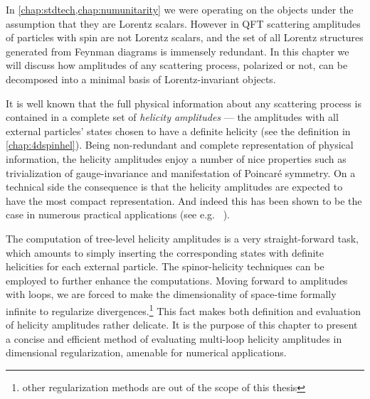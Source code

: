 In \cref{chap:stdtech,chap:numunitarity} we were operating on the objects under the assumption that they are Lorentz scalars.
However in QFT scattering amplitudes of particles with spin are not Lorentz scalars,
and the set of all Lorentz structures generated from Feynman diagrams is immensely redundant.
In this chapter we will discuss how amplitudes of any scattering process, 
polarized or not, can be decomposed into a minimal basis of Lorentz-invariant objects.

It is well known that the full physical information about any scattering process is contained in a complete set of \textit{helicity amplitudes} ---
the amplitudes with all external particles' states chosen to have a definite helicity (see the definition in \cref{chap:4dspinhel}).
Being non-redundant and complete representation of physical information, the helicity amplitudes 
enjoy a number of nice properties such as trivialization of gauge-invariance and manifestation of Poincaré symmetry.
On a technical side the consequence is that the helicity amplitudes are expected to have the most compact representation.
And indeed this has been shown to be the case in numerous practical applications (see e.g.\ %
\cite{DeLaurentis:2019phz,Badger:2019djh,Badger:2011yu,Badger:2013gxa,DeFreitas:2004kmi,Gehrmann:2011aa,Gehrmann:2009vu,Glover:2004si,Glover:2003cm,Garland:2002ak,Dunbar:2016aux,Dunbar:2016gjb,Dunbar:2016cxp,Badger:2015lda,Gehrmann:2015bfy,Bern:2003ck,Bern:2002tk,Badger:2018enw,Dunbar2017,Kunszt:1994nq}).

The computation of tree-level helicity amplitudes is a very straight-forward task,
which amounts to simply inserting the corresponding states with definite helicities for each external particle.
The spinor-helicity techniques can be employed to further enhance the computations.
Moving forward to amplitudes with loops,
we are forced to make the dimensionality of space-time formally infinite \cite{Collins:1984xc} 
to regularize divergences.\footnote{other regularization methods are out of the scope of this thesis}
This fact makes both definition and evaluation of helicity amplitudes rather delicate.
It is the purpose of this chapter to present a concise and efficient method of
evaluating multi-loop helicity amplitudes in dimensional regularization,
amenable for numerical applications.

